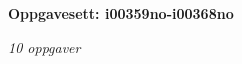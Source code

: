 \centerline{\bf Oppgavesett: i00359no-i00368no}
\vskip 10pt
\centerline{\it 10 oppgaver}\vskip 10pt
\vskip 10pt

